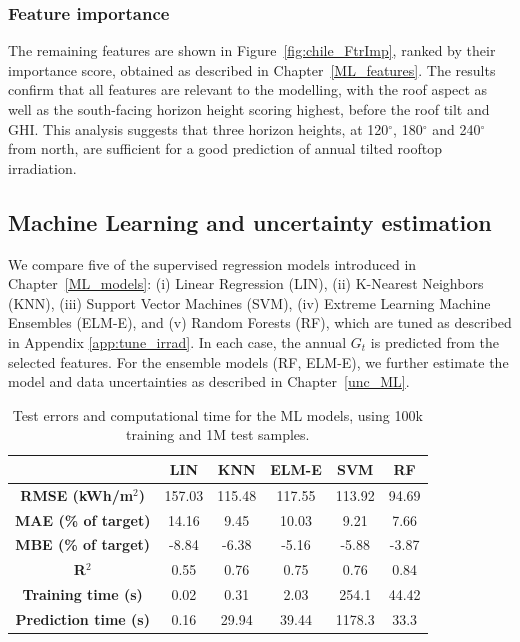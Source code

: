 \subsubsection{Feature importance}
The remaining features are shown in Figure~\ref{fig:chile_FtrImp}, ranked by their importance score, obtained as described in Chapter~\ref{ML_features}. 
The results confirm that all features are relevant to the modelling, with the roof aspect as well as the south-facing horizon height scoring highest, before the roof tilt and GHI. This analysis suggests that three horizon heights, at 120$^\circ$, 180$^\circ$ and 240$^\circ$ from north, are sufficient for a good prediction of annual tilted rooftop irradiation.

\subsection{Machine Learning and uncertainty estimation}
\label{chile_ml}

We compare five of the supervised regression models introduced in Chapter~\ref{ML_models}: (i) Linear Regression (LIN), (ii) K-Nearest Neighbors (KNN), (iii) Support Vector Machines (SVM), (iv) Extreme Learning Machine Ensembles (ELM-E), and (v) Random Forests (RF), which are tuned as described in Appendix \ref{app:tune_irrad}. In each case, the annual $G_t$ is predicted from the selected features. 
For the ensemble models (RF, ELM-E), we further estimate the model and data uncertainties as described in Chapter~\ref{unc_ML}.

\begin{table}[tb]
\centering
\footnotesize
\caption{Test errors and computational time for the ML models, using 100k training and 1M test samples.}
\label{tab:chile_results}
\begin{tabular}{cccccc}
\hline
\textbf{}                    & \textbf{LIN} & \textbf{KNN} & \textbf{ELM-E} & \textbf{SVM} & \textbf{RF} \\ \hline
\textbf{RMSE (kWh/m$^2$)}       & 157.03       & 115.48       & 117.55         & 113.92       & 94.69       \\
\textbf{MAE (\% of target)}  & 14.16        & 9.45         & 10.03          & 9.21         & 7.66        \\
\textbf{MBE (\% of target)}  & -8.84        & -6.38        & -5.16          & -5.88        & -3.87       \\
\textbf{R$^2$}                  & 0.55         & 0.76         & 0.75           & 0.76         & 0.84        \\
\textbf{Training time (s)}   & 0.02         & 0.31         & 2.03           & 254.1        & 44.42       \\
\textbf{Prediction time (s)} & 0.16         & 29.94        & 39.44          & 1178.3       & 33.3        \\ \hline
\end{tabular}
\end{table}

